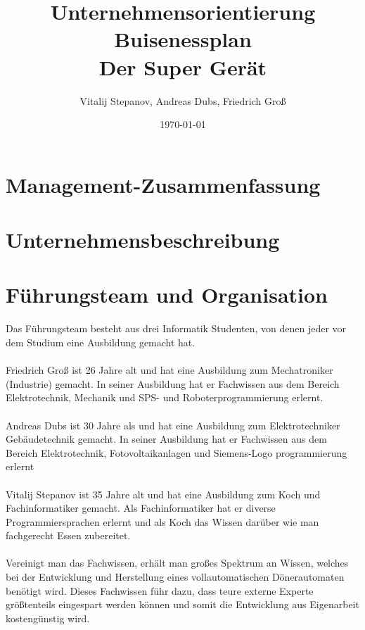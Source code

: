 \documentclass[12pt,a4paper]{scrartcl}
\begin{document}
\title{Unternehmensorientierung\\
	  Buisenessplan\\
	  Der Super Gerät}
\author{Vitalij Stepanov, Andreas Dubs, Friedrich Groß}
\date{\today}
\maketitle


\newpage
\pagestyle{myheadings}
 
\section{Management-Zusammenfassung}

\section{Unternehmensbeschreibung}

\section{Führungsteam und Organisation}
Das Führungsteam besteht aus drei Informatik Studenten, von denen jeder vor dem Studium eine Ausbildung gemacht hat.
\\\\
Friedrich Groß ist 26 Jahre alt und hat eine Ausbildung zum Mechatroniker (Industrie) gemacht.
In seiner Ausbildung hat er Fachwissen aus dem Bereich Elektrotechnik, Mechanik und SPS- und Roboterprogrammierung erlernt.
\\\\
Andreas Dubs ist 30 Jahre als und hat eine Ausbildung zum Elektrotechniker Gebäudetechnik gemacht.
In seiner Ausbildung hat er Fachwissen aus dem Bereich Elektrotechnik, Fotovoltaikanlagen und Siemens-Logo programmierung erlernt
\\\\
Vitalij Stepanov ist 35 Jahre alt und hat eine Ausbildung zum Koch und Fachinformatiker gemacht.
Als Fachinformatiker hat er diverse Programmiersprachen erlernt und als Koch das Wissen darüber wie man fachgerecht Essen zubereitet.
\\\\
Vereinigt man das Fachwissen, erhält man großes Spektrum an Wissen, welches bei der Entwicklung und Herstellung eines
vollautomatischen Dönerautomaten benötigt wird. Dieses Fachwissen führ dazu, dass teure externe Experte größtenteils
eingespart werden können und somit die Entwicklung aus Eigenarbeit kostengünstig wird.
\end{document}

